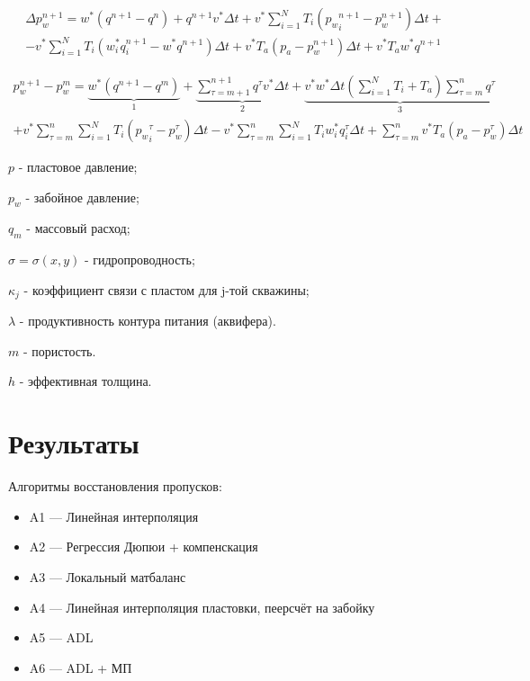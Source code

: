 \documentclass[14pt]{article}
\begin{document}
\begin{eqnarray*}\label{mm3}
 \Delta p_w^{n+1}  = w^*\left(q^{n+1} - q^n\right) 
	+ q^{n+1} v^* \Delta t
	+ v^* \sum_{i=1}^{N} T_i \left({p_w}_i^{n+1}-p_w^{n+1}\right)\Delta t + \\
    - v^* \sum_{i=1}^{N} T_i \left(w_i^* q_i^{n+1}-w^* q^{n+1}\right)\Delta t 
	+  v^* T_a\left(p_a - p_w^{n+1}\right)\Delta t + v^* T_a w^* q^{n+1}
\end{eqnarray*}

\begin{eqnarray*}\label{mm4}
	p_w^{n+1} - p_w^m  = \underbrace{w^*\left(q^{n+1} - q^m\right) }_{1}
	+ \underbrace{\sum_{\tau=m+1}^{n+1}q^\tau v^* \Delta t }_{2}
	+\underbrace{v^* w^* \Delta t\left(\sum_{i=1}^{N} T_i + T_a \right)\sum_{\tau=m}^{n} q^\tau}_{3}\\
	+ v^* \sum_{\tau=m}^{n}\sum_{i=1}^{N} T_i \left({p_w}_i^\tau-p_w^\tau\right)\Delta t  
	- v^*  \sum_{\tau=m}^{n} \sum_{i=1}^{N} T_i w^*_i q_i^\tau \Delta t 
	+  \sum_{\tau=m}^{n} v^* T_a\left(p_a - p_w^\tau\right)\Delta t
\end{eqnarray*}



	$p$ - пластовое давление;
	
	$p_w$ - забойное давление;
	
	$q_m$ - массовый расход;
	
	$\sigma = \sigma(x,y)$ - гидропроводность;
	
	$\kappa_j$ - коэффициент связи с пластом для j-той скважины;
	
	$\lambda$ - продуктивность контура питания (аквифера).
	
	$m$ - пористость.
	
	$h$ - эффективная толщина.
	
\section{Результаты}	
	Алгоритмы восстановления пропусков:
	\begin{itemize}
		\item A1 --- Линейная интерполяция
		\item A2 --- Регрессия Дюпюи + компенскация
		\item A3 --- Локальный матбаланс
		\item A4 --- Линейная интерполяция пластовки, пеерсчёт на забойку
		\item A5 --- ADL
		\item A6 --- ADL + МП
	\end{itemize}
\end{document}
